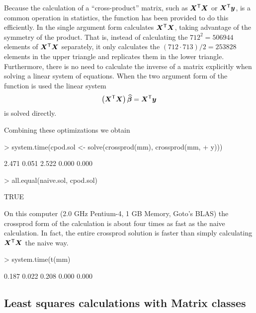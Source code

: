 \documentclass{article}
\begin{document}
Because the calculation of a ``cross-product'' matrix, such as
$\bm{X}^\mathsf{T}\bm{X}$ or $\bm{X}^\mathsf{T}\bm{y}$, is a common operation in
statistics, the  function has been provided to do
this efficiently.  In the single argument form 
calculates $\bm{X}^\mathsf{T}\bm{X}$, taking advantage of the symmetry of the
product.  That is, instead of calculating the $712^2=506944$ elements of
$\bm{X}^\mathsf{T}\bm{X}$ separately, it only calculates the $(712\cdot
713)/2=253828$ elements in the upper triangle and replicates them in
the lower triangle. Furthermore, there is no need to calculate the
inverse of a matrix explicitly when solving a
linear system of equations.  When the two argument form of the 
function is used the linear system
\begin{equation}
  \label{eq:LSQsol}
  \left(\bm{X}^\mathsf{T}\bm{X}\right) \widehat{\bm{\beta}} = \bm{X}^\mathsf{T}\bm{y}
\end{equation}
is solved directly.

Combining these optimizations we obtain
\begin{Schunk}
\begin{Sinput}
> system.time(cpod.sol <- solve(crossprod(mm), crossprod(mm, 
+     y)))
\end{Sinput}
\begin{Soutput}
[1] 2.471 0.051 2.522 0.000 0.000
\end{Soutput}
\begin{Sinput}
> all.equal(naive.sol, cpod.sol)
\end{Sinput}
\begin{Soutput}
[1] TRUE
\end{Soutput}
\end{Schunk}

On this computer (2.0 GHz Pentium-4, 1 GB Memory, Goto's BLAS) the
crossprod form of the calculation is about four times as fast as the
naive calculation.  In fact, the entire crossprod solution is
faster than simply calculating $\bm{X}^\mathsf{T}\bm{X}$ the naive way.
\begin{Schunk}
\begin{Sinput}
> system.time(t(mm) %*% mm)
\end{Sinput}
\begin{Soutput}
[1] 0.187 0.022 0.208 0.000 0.000
\end{Soutput}
\end{Schunk}

\subsection{Least squares calculations with Matrix classes}
\label{sec:MatrixLSQ}
\end{document}
